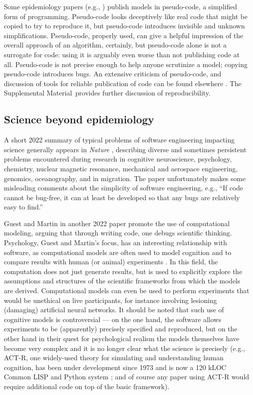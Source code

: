 \documentclass[10pt,letterpaper]{article}
\def \citeeg#1{(e.g., \cite{#1})}
\def\supplement{Supplemental Material}
\begin{document}
Some epidemiology papers \citeeg{pseudo} publish models in pseudo-code, a simplified form of programming. Pseudo-code looks deceptively like real code that might be copied to try to reproduce it, but pseudo-code introduces invisible and unknown simplifications. Pseudo-code, properly used, can give a helpful impression of the overall approach of an algorithm, certainly, but pseudo-code alone is not a surrogate for code: using it is arguably even worse than not publishing code at all. Pseudo-code is not precise enough to help anyone scrutinize a model; copying pseudo-code introduces bugs. An extensive criticism of pseudo-code, and discussion of tools for reliable publication of code can be found elsewhere \cite{relit}. {The \supplement\ provides further discussion of reproducibility.}

\subsection{Science beyond epidemiology}
A short 2022 summary of typical problems of software engineering impacting science generally appears in \emph{Nature} \cite{nature-review}, describing diverse and sometimes persistent problems encountered during research in cognitive neuroscience, psychology, chemistry, nuclear magnetic resonance, mechanical and aerospace engineering, genomics, oceanography, and in migration. The paper \cite{nature-review} unfortunately makes some misleading comments about the simplicity of software engineering, e.g., ``If code cannot be bug-free, it can at least be developed so that any bugs are relatively easy to find.''

Guest and Martin \cite{psychological-modeling} in another 2022 paper promote the use of computational modeling, arguing that through writing code, one debugs scientific thinking. Psychology, Guest and Martin's focus, has an interesting relationship with software, as computational models are often used to model cognition and to compare results with human (or animal) experiments \cite{psychological-modeling}. In this field, the computation does not just generate results, but is used to explicitly explore the assumptions and structures of the scientific frameworks from which the models are derived. Computational models can even be used to perform experiments that would be unethical on live participants, for instance involving lesioning (damaging) artificial neural networks. It should be noted that such use of cognitive models is controversial --- on the one hand, the software allows experiments to be (apparently) precisely specified and reproduced, but on the other hand in their quest for psychological realism the models themselves have become very complex and it is no longer clear what the science is precisely (e.g., ACT-R, one widely-used theory for simulating and understanding human cognition, has been under development since 1973 and is now a 120 kLOC Common LISP and Python system \cite{actr}; and of course any paper using ACT-R would require additional code on top of the basic framework).
\end{document}
